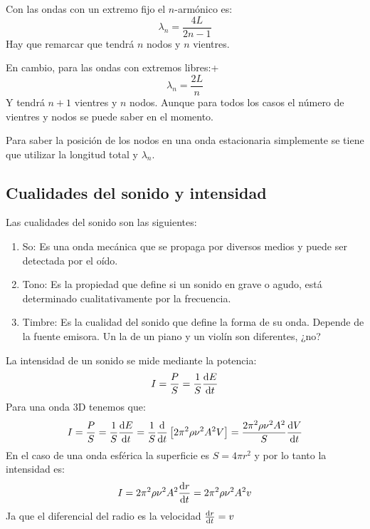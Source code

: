 \documentclass[arial,a4paper,print]{article}
\begin{document}
Con las ondas con un extremo fijo el $n$-armónico es:
\begin{equation*}
	\lambda_{n} = \frac{4L}{2n-1}
\end{equation*}
Hay que remarcar que tendrá $n$ nodos y $n$ vientres.

En cambio, para las ondas con extremos libres:+
\begin{equation*}
	\lambda_{n} = \frac{2L}{n}
\end{equation*}
Y tendrá $n+1$ vientres y $n$ nodos. Aunque para todos los casos el número de vientres y nodos se puede saber en el momento.

Para saber la posición de los nodos en una onda estacionaria simplemente se tiene que utilizar la longitud total y $\lambda_{n}$. 

\subsection{Cualidades del sonido y intensidad}

Las cualidades del sonido son las siguientes:
\begin{enumerate}
	\item So: Es una onda mecánica que se propaga por diversos medios y puede ser detectada por el oído.
	\item Tono: Es la propiedad que define si un sonido en grave o agudo, está determinado cualitativamente por la frecuencia. 
	\item Timbre: Es la cualidad del sonido que define la forma de su onda. Depende de la fuente emisora. Un la de un piano y un violín son diferentes, ¿no?
\end{enumerate}

La intensidad de un sonido se mide mediante la potencia:
\begin{equation*}
	I =\frac PS = \frac 1S \dv{E}{t}
\end{equation*}
Para una onda 3D tenemos que:
\begin{equation*}
	I = \frac PS = \frac 1S \dv{E}{t} = \frac 1S\dv{t}\left[2\pi^{2}\rho\nu^{2}A^{2}V\right] = \frac{2\pi^{2}\rho\nu^{2}A^{2}}{S}\dv{V}{t}
\end{equation*}
En el caso de una onda esférica la superficie es $S=4\pi r^{2}$ y por lo tanto la intensidad es:
\begin{equation*}
	I = 2\pi^2\rho\nu^2A^{2}\dv{r}{t} = 2\pi^2\rho\nu^2A^{2}v
\end{equation*} 
Ja que el diferencial del radio es la velocidad $\dv{r}{t} = v$
\end{document}
